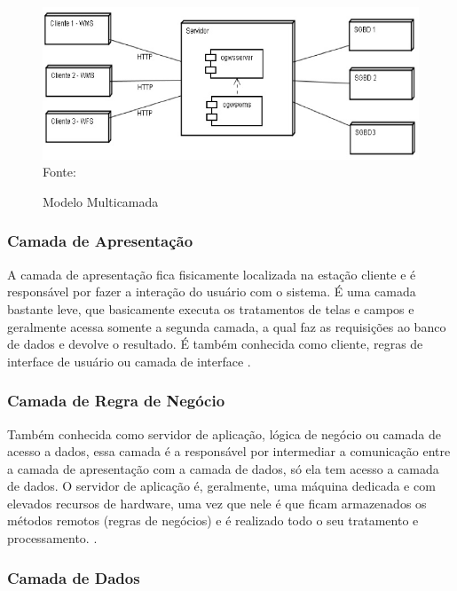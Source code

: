 \begin{figure}[!htpb]
	\centering
	\caption{Modelo Multicamada}
	\label{f_c2_multicamada}
	\includegraphics[width=14cm]{images/multicamada.jpg}\\
    {\footnotesize Fonte: \cite{diegomacedoArqApp}}
 
\end{figure}

\subsubsection{Camada de Apresentação}

A camada de apresentação fica fisicamente localizada na estação cliente e é responsável por fazer a interação do usuário com o sistema. É uma camada bastante leve, que basicamente executa os tratamentos de telas e campos e geralmente acessa somente a segunda camada, a qual faz as requisições ao banco de dados e devolve o resultado. É também conhecida como cliente, regras de interface de usuário ou camada de interface \cite{devmediaMultiCamada2018}.

\subsubsection{Camada de Regra de Negócio}

Também conhecida como servidor de aplicação, lógica de negócio ou camada de acesso a dados, essa camada é a responsável por intermediar a comunicação entre a camada de apresentação com a camada de dados, só ela tem acesso a camada de dados. O servidor de aplicação é, geralmente, uma máquina dedicada e com elevados recursos de hardware, uma vez que nele é que ficam armazenados os métodos remotos (regras de negócios) e é realizado todo o seu tratamento e processamento. \cite{devmediaMultiCamada2018}.

\subsubsection{Camada de Dados}

